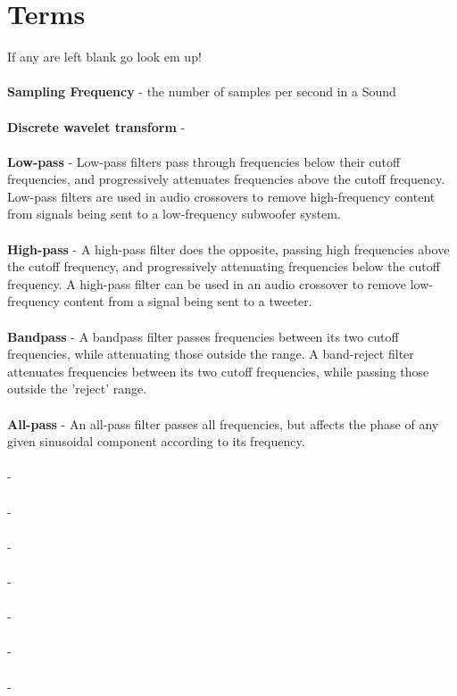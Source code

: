 \documentclass[a4paper]{article}
\begin{document}
    \section{Terms}
        If any are left blank go look em up!\\ \\
         \textbf{Sampling Frequency} - the number of samples per second in a Sound \\ \\
         \textbf{Discrete wavelet transform} - \\ \\
         \textbf{Low-pass} - Low-pass filters pass through frequencies below their cutoff frequencies, and progressively
          attenuates frequencies above the cutoff frequency. Low-pass filters are used in audio crossovers to remove
          high-frequency content from signals being sent to a low-frequency subwoofer system.\\ \\
         \textbf{High-pass} - A high-pass filter does the opposite, passing high frequencies above the cutoff frequency,
          and progressively attenuating frequencies below the cutoff frequency. A high-pass filter can be used in an
          audio crossover to remove low-frequency content from a signal being sent to a tweeter.\\ \\
         \textbf{Bandpass} - A bandpass filter passes frequencies between its two cutoff frequencies, while attenuating
          those outside the range. A band-reject filter attenuates frequencies between its two cutoff frequencies,
          while passing those outside the 'reject' range.\\ \\
         \textbf{All-pass} - An all-pass filter passes all frequencies, but affects the phase of any given sinusoidal
         component according to its frequency.\\ \\
         \textbf{} -  \\ \\
         \textbf{} -  \\ \\
         \textbf{} -  \\ \\
         \textbf{} -  \\ \\
         \textbf{} -  \\ \\
         \textbf{} -  \\ \\
         \textbf{} -  \\ \\
\end{document}
